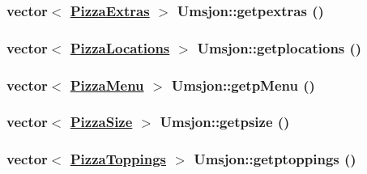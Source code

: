 \hypertarget{class_umsjon_48a5a2fa53cb3c40c681bd053598876b}{
\subsubsection[getpextras]{\setlength{\rightskip}{0pt plus 5cm}vector$<$ \hyperlink{class_pizza_extras}{Pizza\-Extras} $>$ Umsjon::getpextras ()}}
\label{class_umsjon_48a5a2fa53cb3c40c681bd053598876b}


\hypertarget{class_umsjon_a84f9abb849190a11dfcb3f0d5d619cc}{
\subsubsection[getplocations]{\setlength{\rightskip}{0pt plus 5cm}vector$<$ \hyperlink{class_pizza_locations}{Pizza\-Locations} $>$ Umsjon::getplocations ()}}
\label{class_umsjon_a84f9abb849190a11dfcb3f0d5d619cc}


\hypertarget{class_umsjon_729f51349769ff866a7cf5d79d381c2b}{
\subsubsection[getpMenu]{\setlength{\rightskip}{0pt plus 5cm}vector$<$ \hyperlink{class_pizza_menu}{Pizza\-Menu} $>$ Umsjon::getp\-Menu ()}}
\label{class_umsjon_729f51349769ff866a7cf5d79d381c2b}


\hypertarget{class_umsjon_fffa683bcf55b44d751ab146b21b3ae9}{
\subsubsection[getpsize]{\setlength{\rightskip}{0pt plus 5cm}vector$<$ \hyperlink{class_pizza_size}{Pizza\-Size} $>$ Umsjon::getpsize ()}}
\label{class_umsjon_fffa683bcf55b44d751ab146b21b3ae9}


\hypertarget{class_umsjon_63e370dface20065bb6dde6d38ea4287}{
\subsubsection[getptoppings]{\setlength{\rightskip}{0pt plus 5cm}vector$<$ \hyperlink{class_pizza_toppings}{Pizza\-Toppings} $>$ Umsjon::getptoppings ()}}
\label{class_umsjon_63e370dface20065bb6dde6d38ea4287}




